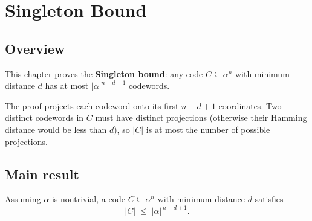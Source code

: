 \chapter{Singleton Bound}
\section{Overview}

This chapter proves the \textbf{Singleton bound}: any code $C\subseteq\alpha^n$ with
minimum distance $d$ has at most $|\alpha|^{n-d+1}$ codewords.

The proof projects each codeword onto its first $n-d+1$ coordinates.  Two distinct
codewords in $C$ must have distinct projections (otherwise their Hamming distance
would be less than $d$), so $|C|$ is at most the number of possible projections.

\section{Main result}

\begin{theorem}
\leanok
{}
Assuming $\alpha$ is nontrivial, a code $C\subseteq\alpha^n$ with minimum distance $d$
satisfies
\[
|C| \;\le\; |\alpha|^{\,n-d+1}.
\]
\end{theorem}
